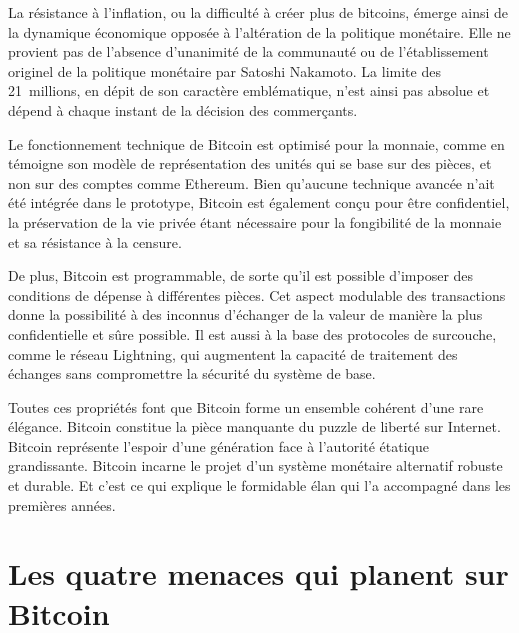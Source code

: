 La résistance à l'inflation, ou la difficulté à créer plus de bitcoins, émerge ainsi de la dynamique économique opposée à l'altération de la politique monétaire. Elle ne provient pas de l'absence d'unanimité de la communauté ou de l'établissement originel de la politique monétaire par Satoshi Nakamoto. La limite des 21~millions, en dépit de son caractère emblématique, n'est ainsi pas absolue et dépend à chaque instant de la décision des commerçants.

Le fonctionnement technique de Bitcoin est optimisé pour la monnaie, comme en témoigne son modèle de représentation des unités qui se base sur des pièces, et non sur des comptes comme Ethereum. Bien qu'aucune technique avancée n'ait été intégrée dans le prototype, Bitcoin est également conçu pour être confidentiel, la préservation de la vie privée étant nécessaire pour la fongibilité de la monnaie et sa résistance à la censure.

De plus, Bitcoin est programmable, de sorte qu'il est possible d'imposer des conditions de dépense à différentes pièces. Cet aspect modulable des transactions donne la possibilité à des inconnus d'échanger de la valeur de manière la plus confidentielle et sûre possible. Il est aussi à la base des protocoles de surcouche, comme le réseau Lightning, qui augmentent la capacité de traitement des échanges sans compromettre la sécurité du système de base.

Toutes ces propriétés font que Bitcoin forme un ensemble cohérent d'une rare élégance. Bitcoin constitue la pièce manquante du puzzle de liberté sur Internet. Bitcoin représente l'espoir d'une génération face à l'autorité étatique grandissante. Bitcoin incarne le projet d'un système monétaire alternatif robuste et durable. Et c'est ce qui explique le formidable élan qui l'a accompagné dans les premières années.


\section*{Les quatre menaces qui planent sur Bitcoin}


